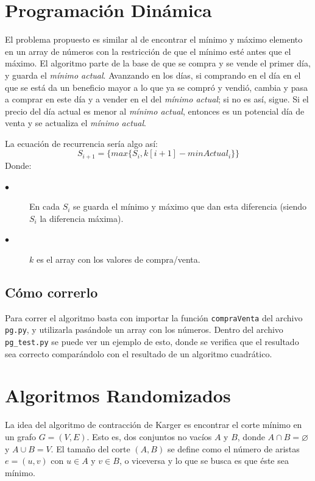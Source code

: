 \documentclass[a4paper,10pt]{article}
\begin{document}
\maketitle
\thispagestyle{empty}

\pagebreak 

\tableofcontents
\pagebreak

\clearpage
\section{Programación Dinámica}
El problema propuesto es similar al de encontrar el mínimo y máximo elemento en un array de números con la restricción de que el mínimo esté antes que el máximo.
El algoritmo parte de la base de que se compra y se vende el primer día, y guarda el \textit{mínimo actual}. Avanzando en los días, si comprando en el día en el que se está da un beneficio mayor a lo que ya se compró y vendió, cambia y pasa a comprar en este día y a vender en el del \textit{mínimo actual}; si no es así, sigue. Si el precio del día actual es menor al \textit{mínimo actual}, entonces es un potencial día de venta y se actualiza el \textit{mínimo actual}.
 
La ecuación de recurrencia sería algo así:
\begin{equation}
	\label{eq:pg}
	S_{i+1}=\{max\{S_i,k[i+1] - minActual_i\}\}
	\tag{1.1}
\end{equation}
Donde:
\begin{description}
  \item[$\bullet$] En cada $S_i$ se guarda el mínimo y máximo que dan esta diferencia (siendo $S_i$ la diferencia máxima).
  \item[$\bullet$] $k$ es el array con los valores de compra/venta.
\end{description}

\subsection{Cómo correrlo}
Para correr el algoritmo basta con importar la función \texttt{compraVenta} del archivo \texttt{pg.py}, y utilizarla pasándole un array con los números. Dentro del archivo \texttt{pg\_test.py} se puede ver un ejemplo de esto, donde se verifica que el resultado sea correcto comparándolo con el resultado de un algoritmo cuadrático.

\section{Algoritmos Randomizados}
La idea del algoritmo de contracción de Karger es encontrar el corte mínimo en un grafo $G=(V,E)$. Esto es, dos conjuntos no vacíos $A$ y $B$, donde $A \cap B = \varnothing$ y $A \cup B = V$. El tamaño del corte $(A,B)$ se define como el número de aristas $e = (u,v)$ con $u \in A$ y $v \in B$, o viceversa y lo que se busca es que éste sea mínimo.
\end{document}
